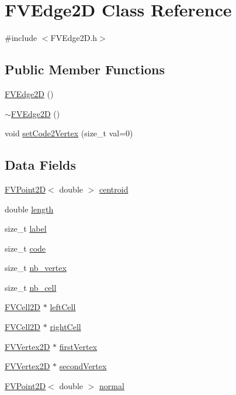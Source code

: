\hypertarget{classFVEdge2D}{
\section{FVEdge2D Class Reference}
\label{db/d31/classFVEdge2D}
}


{\ttfamily \#include $<$FVEdge2D.h$>$}

\subsection*{Public Member Functions}
\begin{DoxyCompactItemize}
\item 
\hyperlink{classFVEdge2D_a20d5f2080d2c0580547e05bce2158cb6}{FVEdge2D} ()
\item 
\hyperlink{classFVEdge2D_a702a1dbbaaa57169410fd9ae789ca408}{$\sim$FVEdge2D} ()
\item 
void \hyperlink{classFVEdge2D_a0a47b3287cfccb79cba1552f3ad1e7b9}{setCode2Vertex} (size\_\-t val=0)
\end{DoxyCompactItemize}
\subsection*{Data Fields}
\begin{DoxyCompactItemize}
\item 
\hyperlink{classFVPoint2D}{FVPoint2D}$<$ double $>$ \hyperlink{classFVEdge2D_ab3ed78ad91cf05def39147f46817c454}{centroid}
\item 
double \hyperlink{classFVEdge2D_a928b11f5716331f0b89abe7d8d4124b4}{length}
\item 
size\_\-t \hyperlink{classFVEdge2D_a1ec973463c76e6d9e91160720959ad68}{label}
\item 
size\_\-t \hyperlink{classFVEdge2D_acf258c3b3328a96e3ee1e3b875b7874f}{code}
\item 
size\_\-t \hyperlink{classFVEdge2D_a0a063e99fbc85e837d93dfbcda6f5252}{nb\_\-vertex}
\item 
size\_\-t \hyperlink{classFVEdge2D_a1a5a11cfc8bbaa0cf132759c0382da70}{nb\_\-cell}
\item 
\hyperlink{classFVCell2D}{FVCell2D} $\ast$ \hyperlink{classFVEdge2D_aba085f043c4b6ddc571ff574f4c4e3e3}{leftCell}
\item 
\hyperlink{classFVCell2D}{FVCell2D} $\ast$ \hyperlink{classFVEdge2D_a0b77cc6541648a710e72fc0a59cb318d}{rightCell}
\item 
\hyperlink{classFVVertex2D}{FVVertex2D} $\ast$ \hyperlink{classFVEdge2D_aa200b3a3e97b615f25128922c926e1b4}{firstVertex}
\item 
\hyperlink{classFVVertex2D}{FVVertex2D} $\ast$ \hyperlink{classFVEdge2D_ac6bb5fc1a5f4ae86b6d0b5d06d86dc05}{secondVertex}
\item 
\hyperlink{classFVPoint2D}{FVPoint2D}$<$ double $>$ \hyperlink{classFVEdge2D_a5b771cf762f8097181201565a3e7b490}{normal}
\end{DoxyCompactItemize}


